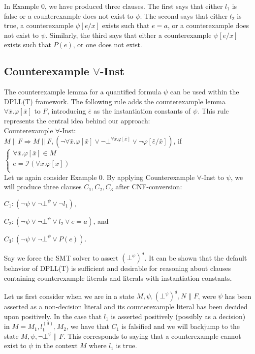 \documentclass{llncs}
\begin{document}
In Example 0, we have produced three clauses.
The first says that either $l_1$ is false or a counterexample does not exist to $\psi$.
The second says that either $l_2$ is true, a counterexample $\psi[e/x]$ exists such that $e = a$, or a counterexample does not exist to $\psi$. 
Similarly, the third says that either a counterexample $\psi[e/x]$ exists such that $P( e )$, or one does not exist.

\subsection{Counterexample $\forall$-Inst}

The counterexample lemma for a quantified formula $\psi$ can be used within the DPLL(T) framework.
The following rule adds the counterexample lemma $\forall \bar{x}. \varphi[ \bar{ x } ]$ to $F$, introducing $\bar{e}$ as the instantiation constants of $\psi$.
This rule represents the central idea behind our approach: \\

\noindent Counterexample $\forall$-Inst: \\

$M \parallel F \Longrightarrow M \parallel F, (\neg \forall \bar{x}. \varphi[ \bar{x} ] \vee \neg \bot^{\forall \bar{x}. \varphi[ \bar{x} ]} \vee \neg \varphi[ \bar{ e }/\bar{x} ])$, if   
$\begin{cases}
  \forall \bar{x}. \varphi[ \bar{ x } ] \in M \\
  \bar{ e } = \mathcal{I}( \forall \bar{x}. \varphi[ \bar{ x } ] ) \\
\end{cases}$ \\

Let us again consider Example 0.
By applying Counterexample $\forall$-Inst to $\psi$, we will produce three clauses $C_1, C_2, C_3$ after CNF-conversion:

$C_1 : ( \neg \psi \vee \neg \bot^\psi \vee \neg l_1 )$,

$C_2 : ( \neg \psi \vee \neg \bot^\psi \vee l_2 \vee e = a )$, and

$C_3 : ( \neg \psi \vee \neg \bot^\psi \vee P( e ) )$.

Say we force the SMT solver to assert $( \bot^\psi )^d$.
It can be shown that the default behavior of DPLL(T) is sufficient and desirable for reasoning about clauses containing counterexample literals and literals with instantiation constants.

Let us first consider when we are in a state $M, \psi, ( \bot^\psi )^d, N \parallel F$, were $\psi$ has been asserted as a non-decision literal and its counterexample literal has been decided upon positively.
In the case that $l_1$ is asserted positively (possibly as a decision) in $M = M_1, l^{(d)}_1, M_2$, we have that $C_1$ is falsified and we will backjump to the state $M, \psi, \neg \bot^\psi \parallel F$.
This corresponds to saying that a counterexample cannot exist to $\psi$ in the context $M$ where $l_1$ is true.
\end{document}
